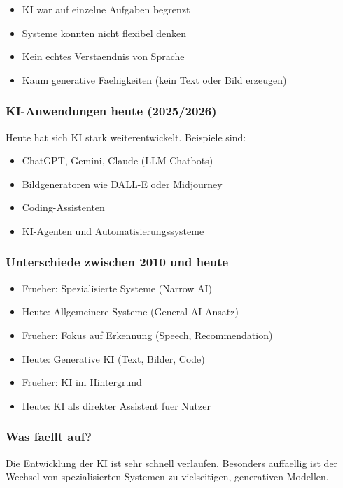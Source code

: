 \documentclass[12pt,a4paper]{article}
\begin{document}
\begin{itemize}
    \item KI war auf einzelne Aufgaben begrenzt
    \item Systeme konnten nicht flexibel denken
    \item Kein echtes Verstaendnis von Sprache
    \item Kaum generative Faehigkeiten (kein Text oder Bild erzeugen)
\end{itemize}

\subsubsection*{KI-Anwendungen heute (2025/2026)}

Heute hat sich KI stark weiterentwickelt. Beispiele sind:

\begin{itemize}
    \item ChatGPT, Gemini, Claude (LLM-Chatbots)
    \item Bildgeneratoren wie DALL-E oder Midjourney
    \item Coding-Assistenten
    \item KI-Agenten und Automatisierungssysteme
\end{itemize}

\subsubsection*{Unterschiede zwischen 2010 und heute}

\begin{itemize}
    \item Frueher: Spezialisierte Systeme (Narrow AI)
    \item Heute: Allgemeinere Systeme (General AI-Ansatz)
    \item Frueher: Fokus auf Erkennung (Speech, Recommendation)
    \item Heute: Generative KI (Text, Bilder, Code)
    \item Frueher: KI im Hintergrund
    \item Heute: KI als direkter Assistent fuer Nutzer
\end{itemize}

\subsubsection*{Was faellt auf?}

Die Entwicklung der KI ist sehr schnell verlaufen.
Besonders auffaellig ist der Wechsel von spezialisierten Systemen
zu vielseitigen, generativen Modellen.
\end{document}
